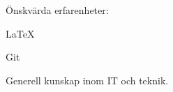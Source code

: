 \documentclass[10pt]{article}
\begin{document}
    
    
    Önskvärda erfarenheter:
    \begin{dashlist}
        \item \LaTeX
        \item Git
        \item Generell kunskap inom IT och teknik. 
    \end{dashlist}
        
    
\end{document}

